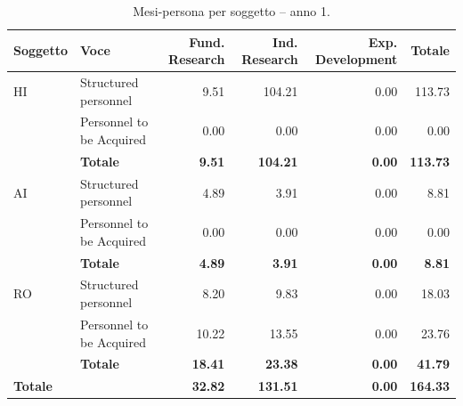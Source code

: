 \documentclass{plan4ari_report}
\begin{document}
\clearpage
\begin{table}[H]\centering\small\caption{Mesi-persona per soggetto -- anno 1.}\label{tab:wp-s-y1}
\begin{tabular}{llrrrr}\toprule\textbf{Soggetto} & \textbf{Voce} & \textbf{Fund. Research} & \textbf{Ind. Research} & \textbf{Exp. Development} & \textbf{Totale} \\\midrule
HI & Structured personnel & 9.51 & 104.21 & 0.00 & 113.73 \\
 & Personnel to be Acquired & 0.00 & 0.00 & 0.00 & 0.00 \\
 & \textbf{Totale} & \textbf{9.51} & \textbf{104.21} & \textbf{0.00} & \textbf{113.73} \\\midrule
AI & Structured personnel & 4.89 & 3.91 & 0.00 & 8.81 \\
 & Personnel to be Acquired & 0.00 & 0.00 & 0.00 & 0.00 \\
 & \textbf{Totale} & \textbf{4.89} & \textbf{3.91} & \textbf{0.00} & \textbf{8.81} \\\midrule
RO & Structured personnel & 8.20 & 9.83 & 0.00 & 18.03 \\
 & Personnel to be Acquired & 10.22 & 13.55 & 0.00 & 23.76 \\
 & \textbf{Totale} & \textbf{18.41} & \textbf{23.38} & \textbf{0.00} & \textbf{41.79} \\\midrule
\textbf{Totale} & & \textbf{32.82} & \textbf{131.51} & \textbf{0.00} & \textbf{164.33} \\
\bottomrule\end{tabular}\end{table}
\end{document}
